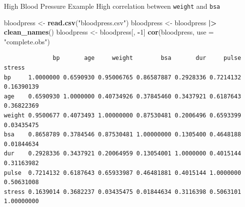 \documentclass[
  ignorenonframetext,
]{beamer}
\newenvironment{Shaded}{\begin{snugshade}}{\end{snugshade}}
\newcommand{\AttributeTok}[1]{\textcolor[rgb]{0.13,0.29,0.53}{#1}}
\newcommand{\DecValTok}[1]{\textcolor[rgb]{0.00,0.00,0.81}{#1}}
\newcommand{\FunctionTok}[1]{\textcolor[rgb]{0.13,0.29,0.53}{\textbf{#1}}}
\newcommand{\NormalTok}[1]{#1}
\newcommand{\OtherTok}[1]{\textcolor[rgb]{0.56,0.35,0.01}{#1}}
\newcommand{\SpecialCharTok}[1]{\textcolor[rgb]{0.81,0.36,0.00}{\textbf{#1}}}
\newcommand{\StringTok}[1]{\textcolor[rgb]{0.31,0.60,0.02}{#1}}
\begin{document}
\begin{frame}[fragile]{High Blood Pressure Example}
\label{high-blood-pressure-example-1}
High correlation between \texttt{weight} and \texttt{bsa}

\scriptsize

\begin{Shaded}
\begin{Highlighting}[]
\NormalTok{bloodpress }\OtherTok{\textless{}{-}} \FunctionTok{read.csv}\NormalTok{(}\StringTok{"bloodpress.csv"}\NormalTok{)}
\NormalTok{bloodpress }\OtherTok{\textless{}{-}}\NormalTok{ bloodpress }\SpecialCharTok{|\textgreater{}} 
  \FunctionTok{clean\_names}\NormalTok{()}
\NormalTok{bloodpress }\OtherTok{\textless{}{-}}\NormalTok{ bloodpress[, }\SpecialCharTok{{-}}\DecValTok{1}\NormalTok{]}
\FunctionTok{cor}\NormalTok{(bloodpress, }\AttributeTok{use =} \StringTok{"complete.obs"}\NormalTok{)}
\end{Highlighting}
\end{Shaded}

\begin{verbatim}
              bp       age     weight        bsa       dur     pulse     stress
bp     1.0000000 0.6590930 0.95006765 0.86587887 0.2928336 0.7214132 0.16390139
age    0.6590930 1.0000000 0.40734926 0.37845460 0.3437921 0.6187643 0.36822369
weight 0.9500677 0.4073493 1.00000000 0.87530481 0.2006496 0.6593399 0.03435475
bsa    0.8658789 0.3784546 0.87530481 1.00000000 0.1305400 0.4648188 0.01844634
dur    0.2928336 0.3437921 0.20064959 0.13054001 1.0000000 0.4015144 0.31163982
pulse  0.7214132 0.6187643 0.65933987 0.46481881 0.4015144 1.0000000 0.50631008
stress 0.1639014 0.3682237 0.03435475 0.01844634 0.3116398 0.5063101 1.00000000
\end{verbatim}

\normalsize
\end{frame}
\end{document}
